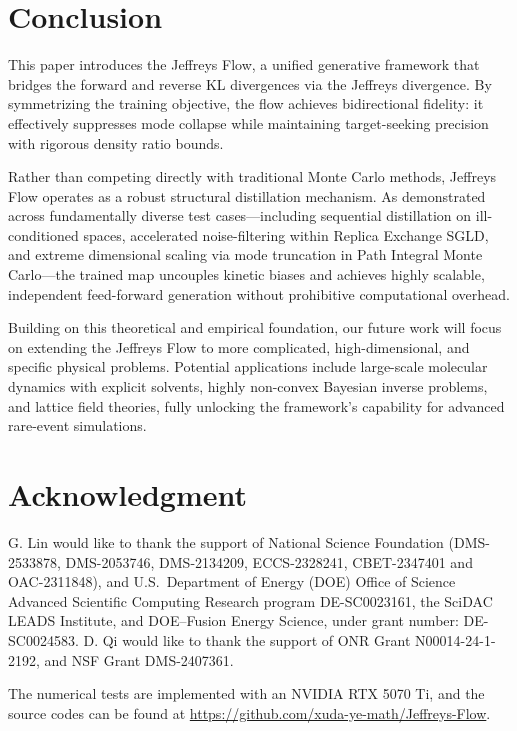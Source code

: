 \documentclass[%
 reprint,
 amsmath,amssymb,
 aps,
 pre,
]{revtex4-2}
\begin{document}
\section{Conclusion}
\label{section: conclusion}

This paper introduces the Jeffreys Flow, a unified generative framework that bridges the forward and reverse KL divergences via the Jeffreys divergence. By symmetrizing the training objective, the flow achieves bidirectional fidelity: it effectively suppresses mode collapse while maintaining target-seeking precision with rigorous density ratio bounds.

Rather than competing directly with traditional Monte Carlo methods, Jeffreys Flow operates as a robust structural distillation mechanism. As demonstrated across fundamentally diverse test cases---including sequential distillation on ill-conditioned spaces, accelerated noise-filtering within Replica Exchange SGLD, and extreme dimensional scaling via mode truncation in Path Integral Monte Carlo---the trained map uncouples kinetic biases and achieves highly scalable, independent feed-forward generation without prohibitive computational overhead. 

Building on this theoretical and empirical foundation, our future work will focus on extending the Jeffreys Flow to more complicated, high-dimensional, and specific physical problems. Potential applications include large-scale molecular dynamics with explicit solvents, highly non-convex Bayesian inverse problems, and lattice field theories, fully unlocking the framework's capability for advanced rare-event simulations.

\section*{Acknowledgment}
G. Lin would like to thank the support of National Science Foundation (DMS-2533878, DMS-2053746, DMS-2134209, ECCS-2328241, CBET-2347401 and OAC-2311848), and U.S.~Department of Energy (DOE) Office of Science Advanced Scientific Computing Research program DE-SC0023161, the SciDAC LEADS Institute, and DOE–Fusion Energy Science, under grant number: DE-SC0024583.
D. Qi would like to thank the support of ONR Grant N00014-24-1-2192, and NSF Grant DMS-2407361.

The numerical tests are implemented with an NVIDIA RTX 5070 Ti, and the source codes can be found at \url{https://github.com/xuda-ye-math/Jeffreys-Flow}.


\end{document}
